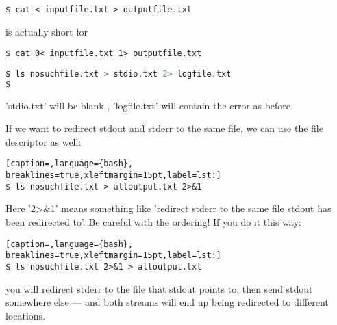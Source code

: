 \scriptsize
\begin{verbatim}
$ cat < inputfile.txt > outputfile.txt
\end{verbatim}
\normalsize

is actually short for
\scriptsize
\begin{verbatim}
$ cat 0< inputfile.txt 1> outputfile.txt
\end{verbatim}
\normalsize

\lstset{basicstyle=\scriptsize, numbers=left, captionpos=b, tabsize=4}
\begin{lstlisting}[caption=We can also redirect both 'stdout' and 'stderr' independently like this:,language={bash},
breaklines=true,xleftmargin=15pt,label=lst:We can also redirect both 'stdout' and 'stderr' independently like this:]
$ ls nosuchfile.txt > stdio.txt 2> logfile.txt 
$
\end{lstlisting}

'stdio.txt' will be blank , 'logfile.txt' will contain the error as before.

If we want to redirect stdout and stderr to the same file, we can use the file
descriptor as well:

\lstset{basicstyle=\scriptsize, numbers=left, captionpos=b, tabsize=4}
\begin{lstlisting}[caption=,language={bash},
breaklines=true,xleftmargin=15pt,label=lst:]
$ ls nosuchfile.txt > alloutput.txt 2>&1
\end{lstlisting}

Here '2\textgreater{}\&1' means something like 'redirect stderr to the same
file stdout has been redirected to'. Be careful with the ordering! If you do it
this way:

\lstset{basicstyle=\scriptsize, numbers=left, captionpos=b, tabsize=4}
\begin{lstlisting}[caption=,language={bash},
breaklines=true,xleftmargin=15pt,label=lst:]
$ ls nosuchfile.txt 2>&1 > alloutput.txt
\end{lstlisting}

you will redirect stderr to the file that stdout points to, then send stdout
somewhere else --- and both streams will end up being redirected to different
locations.

